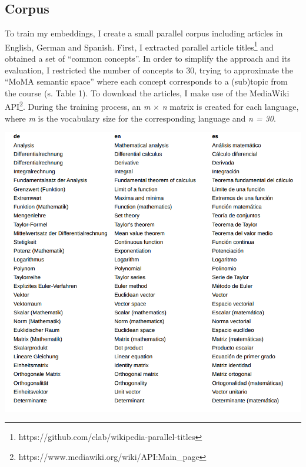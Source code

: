 \documentclass[a4paper]{article}
\begin{document}
\subsection{Corpus}
To train my embeddings, I create a small parallel corpus including articles in English, German and Spanish. First, I extracted parallel article titles\footnote{https://github.com/clab/wikipedia-parallel-titles} and obtained a set of ``common concepts''. In order to simplify the approach and its evaluation, I restricted the number of concepts to 30, trying to approximate the ``MoMA semantic space'' where each concept corresponds to a (sub)topic from the course (s. Table 1). To download the articles, I make use of the MediaWiki API\footnote{https://www.mediawiki.org/wiki/API:Main_page}. During the training process, an \textit{m} $\times$ \textit{n} matrix is created for each language, where \textit{m} is the vocabulary size for the corresponding language and \textit{n = 30}.
\begin{center}
\includegraphics[scale=0.3]{mutual.png}\\
\caption{Table 1: mutual concepts, each row corresponds to a concept}
\end{center}
\end{document}
